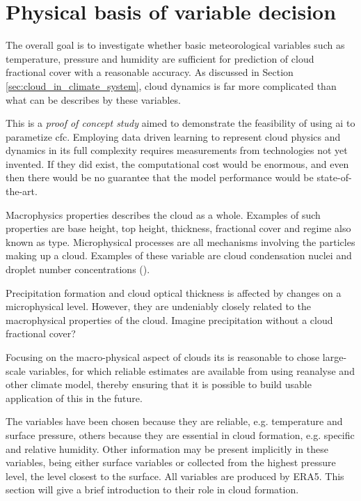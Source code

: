 \section{Physical basis of variable decision} \label{sec:ecc}
The overall goal is to investigate whether basic meteorological variables such as temperature, pressure and humidity are sufficient for prediction of cloud fractional cover with a reasonable accuracy. As discussed in Section \ref{sec:cloud_in_climate_system}, cloud dynamics is far more complicated than what can be describes by these variables. 

This is a \textit{proof of concept study} aimed to demonstrate the feasibility of using \acrshort{ai} to parametize \acrshort{cfc}. Employing data driven learning to represent cloud physics and dynamics in its full complexity requires measurements from technologies not yet invented. If they did exist, the computational cost would be enormous, and even then there would be no guarantee that the model performance would be state-of-the-art.

Macrophysics properties describes the cloud as a whole. Examples of such properties are base height, top height, thickness, fractional cover and regime also known as type. Microphysical processes are all mechanisms involving the particles making up a cloud. Examples of these variable are cloud condensation nuclei and droplet number concentrations (\cite{Grabowski2019ModelingBetter}). 

Precipitation formation and cloud optical thickness is affected by changes on a microphysical level. However, they are undeniably closely related to the macrophysical properties of the cloud. Imagine precipitation without a cloud fractional cover? 

Focusing on the macro-physical aspect of clouds its is reasonable to chose large-scale variables, for which reliable estimates are available from using reanalyse and other climate model, thereby ensuring that it is possible to build usable application of this in the future. 

The variables have been chosen because they are reliable, e.g. temperature and surface pressure,  others because they are essential in cloud formation, e.g. specific and relative humidity. Other information may be present implicitly in these variables, being either surface variables or collected from the highest pressure level, the level closest to the surface. All variables are produced by ERA5. This section will give a brief introduction to their role in cloud formation. 

